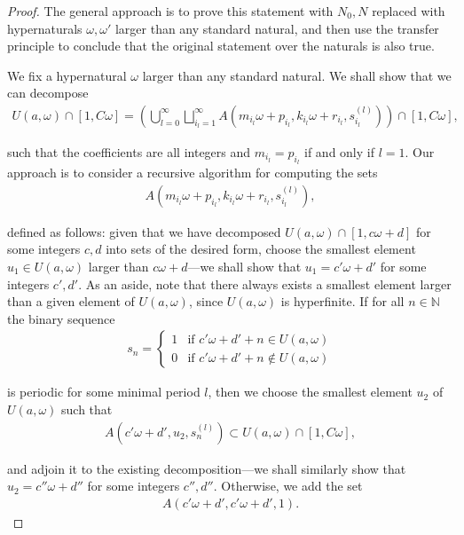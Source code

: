 \documentclass{amsart}
\newcommand{\NN}{\mathbb{N}}
\theoremstyle{theorem}
\theoremstyle{definition}
\begin{document}
\begin{proof}
The general approach is to prove this statement with $N_0,N$ replaced with hypernaturals $\omega,\omega'$ larger than any standard natural, and then use the transfer principle to conclude that the original statement over the naturals is also true.
	
We fix a hypernatural $\omega$ larger than any standard natural. We shall show that we can decompose
	\begin{align*}
	U(a,\omega) \cap [1,C\omega] = \left(\bigcup_{l = 0}^\infty\bigsqcup_{i_l = 1}^\infty A\left(m_{i_l}\omega + p_{i_l}, k_{i_l}\omega + r_{i_l},s^{(l)}_{i_l}\right)\right) \cap [1,C\omega],
	\end{align*}
			
\noindent such that the coefficients are all integers and $m_{i_l} = p_{i_l}$ if and only if $l = 1$. Our approach is to consider a recursive algorithm for computing the sets
	\begin{align*}
	A\left(m_{i_l}\omega + p_{i_l}, k_{i_l}\omega + r_{i_l},s^{(l)}_{i_l}\right),
	\end{align*}
		
\noindent defined as follows: given that we have decomposed $U(a,\omega) \cap [1, c\omega + d]$ for some integers $c,d$ into sets of the desired form, choose the smallest element $u_1 \in U(a,\omega)$ larger than $c\omega + d$---we shall show that $u_1 = c'\omega + d'$ for some integers $c',d'$. As an aside, note that there always exists a smallest element larger than a given element of $U(a,\omega)$, since $U(a,\omega)$ is hyperfinite. If for all $n \in \NN$ the binary sequence
	\begin{align*}
	s_n = \begin{cases} 1 & \text{if } c'\omega + d' + n \in U(a,\omega) \\ 0 & \text{if } c'\omega + d' + n \notin U(a,\omega) \end{cases}
	\end{align*}
		
\noindent is periodic for some minimal period $l$, then we choose the smallest element $u_2$ of $U(a,\omega)$ such that
	\begin{align*}
	A\left(c'\omega + d', u_2, s_n^{(l)}\right) \subset U(a,\omega) \cap [1,C\omega],
	\end{align*}
		
\noindent and adjoin it to the existing decomposition---we shall similarly show that $u_2 = c''\omega + d''$ for some integers $c'', d''$. Otherwise, we add the set
	\begin{align*}
	A\left(c'\omega + d', c'\omega + d', 1\right).
	\end{align*}
		

\end{proof}
\end{document}
